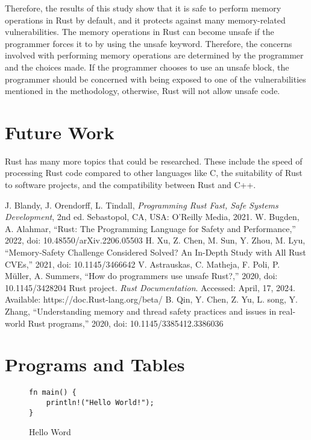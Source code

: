 \documentclass[sigconf,authorversion,nonacm]{acmart}
\begin{document}
Therefore, the results of this study show that it is safe to perform memory operations in Rust by default, and it protects against many memory-related vulnerabilities. The memory operations in Rust can become unsafe if the programmer forces it to by using the unsafe keyword. Therefore, the concerns involved with performing memory operations are determined by the programmer and the choices made. If the programmer chooses to use an unsafe block, the programmer should be concerned with being exposed to one of the vulnerabilities mentioned in the methodology, otherwise, Rust will not allow unsafe code.

\section*{Future Work}
Rust has many more topics that could be researched. These include the speed of processing Rust code compared to other languages like C, the suitability of Rust to software projects, and the compatibility between Rust and C++.

\begin{thebibliography}{9}
J. Blandy, J. Orendorff, L. Tindall, \textit{Programming Rust Fast, Safe Systems Development}, 2nd ed. Sebastopol, CA, USA: O’Reilly Media, 2021.
W. Bugden, A. Alahmar, “Rust: The Programming Language for Safety and Performance,” 2022, doi: 10.48550/arXiv.2206.05503
H. Xu, Z. Chen, M. Sun, Y. Zhou, M. Lyu, “Memory-Safety Challenge Considered Solved? An In-Depth Study with All Rust CVEs,” 2021, doi: 10.1145/3466642
V. Astrauskas, C. Matheja, F. Poli, P. Müller, A. Summers, “How do programmers use unsafe Rust?,” 2020, doi: 10.1145/3428204
Rust project. \textit{Rust Documentation}. Accessed: April, 17, 2024. Available: https://doc.Rust-lang.org/beta/
B. Qin, Y. Chen, Z. Yu, L. song, Y. Zhang, “Understanding memory and thread safety practices and issues in real-world Rust programs,” 2020, doi: 10.1145/3385412.3386036 
\end{thebibliography}

\section*{Programs and Tables}

\begin{figure} [H] 
\caption{Hello Word}
    \begin{lstlisting}
fn main() {
    println!("Hello World!");
}
    \end{lstlisting}
\end{figure}
\end{document}
